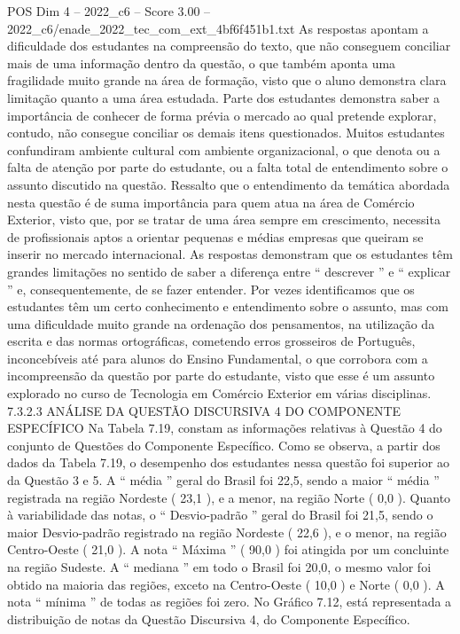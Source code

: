 \begin{textsample}{POS Dim 4 – 2022\_c6 – Score 3.00 – 2022\_c6/enade\_2022\_tec\_com\_ext\_4bf6f451b1.txt}
As respostas apontam a dificuldade dos estudantes na compreensão do texto, que não conseguem conciliar mais de uma informação dentro da questão, o que também aponta uma fragilidade muito grande na área de formação, visto que o aluno demonstra clara limitação quanto a uma área estudada.
Parte dos estudantes demonstra saber a importância de conhecer de forma prévia o mercado ao qual pretende explorar, contudo, não consegue conciliar os demais itens questionados.
Muitos estudantes confundiram ambiente cultural com ambiente organizacional, o que denota ou a falta de atenção por parte do estudante, ou a falta total de entendimento sobre o assunto discutido na questão.
Ressalto que o entendimento da temática abordada nesta questão é de suma importância para quem atua na área de Comércio Exterior, visto que, por se tratar de uma área sempre em crescimento, necessita de profissionais aptos a orientar pequenas e médias empresas que queiram se inserir no mercado internacional.
As respostas demonstram que os estudantes têm grandes limitações no sentido de saber a diferença entre “ descrever ” e “ explicar ” e, consequentemente, de se fazer entender.
Por vezes identificamos que os estudantes têm um certo conhecimento e entendimento sobre o assunto, mas com uma dificuldade muito grande na ordenação dos pensamentos, na utilização da escrita e das normas ortográficas, cometendo erros grosseiros de Português, inconcebíveis até para alunos do Ensino Fundamental, o que corrobora com a incompreensão da questão por parte do estudante, visto que esse é um assunto explorado no curso de Tecnologia em Comércio Exterior em várias disciplinas. 7.3.2.3 ANÁLISE DA QUESTÃO DISCURSIVA 4 DO COMPONENTE ESPECÍFICO Na Tabela 7.19, constam as informações relativas à Questão 4 do conjunto de Questões do Componente Específico.
Como se observa, a partir dos dados da Tabela 7.19, o desempenho dos estudantes nessa questão foi superior ao da Questão 3 e 5.
A “ média ” geral do Brasil foi 22,5, sendo a maior “ média ” registrada na região Nordeste ( 23,1 ), e a menor, na região Norte ( 0,0 ).
Quanto à variabilidade das notas, o “ Desvio-padrão ” geral do Brasil foi 21,5, sendo o maior Desvio-padrão registrado na região Nordeste ( 22,6 ), e o menor, na região Centro-Oeste ( 21,0 ).
A nota “ Máxima ” ( 90,0 ) foi atingida por um concluinte na região Sudeste.
A “ mediana ” em todo o Brasil foi 20,0, o mesmo valor foi obtido na maioria das regiões, exceto na Centro-Oeste ( 10,0 ) e Norte ( 0,0 ).
A nota “ mínima ” de todas as regiões foi zero.
No Gráfico 7.12, está representada a distribuição de notas da Questão Discursiva 4, do Componente Específico.

\end{textsample}
